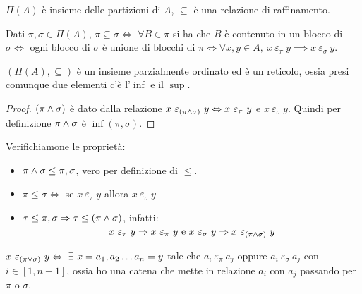 $\Pi (A)$ \`e insieme delle partizioni di $A$, $\subseteq $ \`e una relazione di raffinamento.

Dati $\pi, \sigma \in \Pi(A)$, $\pi \subseteq \sigma \iff $ $\forall B \in \pi$ si ha che $B$ \`e contenuto in un blocco di $\sigma \iff $ ogni blocco di $\sigma$ \`e unione di blocchi di $\pi \iff \forall x, y \in A , \ x \ \varepsilon_{\pi} \ y \implies x \ \varepsilon_{\sigma} \ y$.

\begin{prop}
$\left( \Pi(A) , \subseteq \right)$ \`e un insieme parzialmente ordinato ed \`e un reticolo, ossia presi comunque due elementi c'\`e l'$\inf$ e il $\sup$.
\end{prop}
\begin{proof}
$(\pi \wedge \sigma)$ \`e dato dalla relazione $ x \ \varepsilon_{(\pi \infop \sigma)} \ y \iff x \ \varepsilon_{\pi} \ y $ e $ x \ \varepsilon_{\sigma} \ y $. Quindi per definizione $\pi \wedge \sigma $ \`e $\inf( \pi, \sigma)$.
\end{proof}

Verifichiamone le propriet\`a:
\begin{itemize}
  \item $\pi \wedge \sigma \le \pi, \sigma$, vero per definizione di $\le$.
  \item $\pi \le \sigma \iff $ se $ x \ \varepsilon_{\pi} \ y $ allora $x \ \varepsilon_{\sigma} \ y$
  \item $\tau \le \pi, \sigma \Rightarrow \tau \le (\pi \wedge \sigma)$, infatti:
   \[
   x \ \varepsilon_{\tau} \ y \implies 
   x \ \varepsilon_{\pi} \ y \text{ e }
   x \ \varepsilon_{\sigma} \ y 
   \implies x \ \varepsilon_{(\pi \infop \sigma)} \ y
   \]
\end{itemize}

\begin{defn}
$x \ \varepsilon_{(\pi \supop \sigma)} \ y \iff \exists x = a_1, a_2 \dots a_n = y $ tale che $a_i \ \varepsilon_{\pi} \ a_j$ oppure $a_i \ \varepsilon_{\sigma} \ a_j$ con $i \in [1, n-1]$, ossia ho una catena che mette in relazione $a_i$ con $a_j$ passando per $\pi$ o $\sigma$.
\end{defn}

